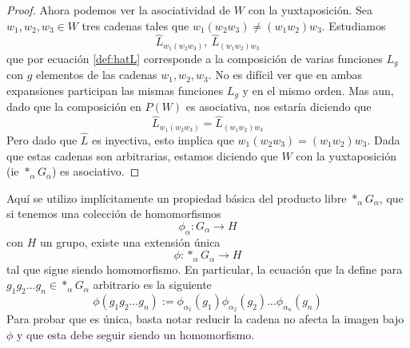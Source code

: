 \begin{proof}
  Ahora podemos ver la asociatividad de \(W\) con la yuxtaposición. Sea
  \(w_1, w_2, w_3 \in W\) tres cadenas tales que \(w_1 (w_2 w_3) \neq
  (w_1 w_2) w_3\). Estudiamos \[\hat L_{w_1 (w_2 w_3)},\ \hat L_{(w_1
    w_2) w_3}\] que por ecuación \eqref{def:hatL} corresponde a la
  composición de varias funciones \(L_g\) con \(g\) elementos de las
  cadenas \(w_1, w_2, w_3\).  No es difícil ver que en ambas expansiones
  participan las mismas funciones \(L_g\) y en el mismo orden. Mas aun,
  dado que la composición en \(P(W)\) es asociativa, nos estaría diciendo
  que
  \[ \hat L_{w_1 (w_2 w_3)} = \hat L_{(w_1 w_2) w_3}\]
  Pero dado que \(\hat L\) es inyectiva, esto implica que \(w_1 (w_2
  w_3) = (w_1 w_2) w_3\). Dada que estas cadenas son arbitrarias,
  estamos diciendo que \(W\) con la yuxtaposición (ie \(*_\alpha
  G_\alpha\)) es asociativo.
\end{proof}

Aquí se utilizo implícitamente un propiedad básica del producto libre
\(*_\alpha G_\alpha\), que si tenemos una colección de homomorfismos
\[ \phi_\alpha : G_\alpha \to H \]
con \(H\) un grupo, existe una extensión única
\[ \phi : *_\alpha G_\alpha \to H \]
tal que sigue siendo homomorfismo. En particular, la ecuación que la
define para \(g_1 g_2 \dots g_n \in *_\alpha G_\alpha\) arbitrario es la siguiente
\begin{equation} \label{def:induced-morfism-free}
  \phi \left( g_1 g_2 \dots g_n \right) := \phi_{\alpha_1} (g_1)
  \phi_{\alpha_2} (g_2) \dots \phi_{\alpha_n} (g_n)
\end{equation}
Para probar que es única, basta notar reducir la cadena no afecta la
imagen bajo \(\phi\) y que esta debe seguir siendo un homomorfismo.

